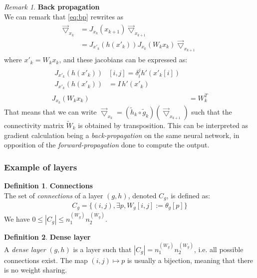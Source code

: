 \documentclass{article}
\theoremstyle{definition}
\newtheorem{definition}{Definition}[section]
\theoremstyle{remark}
\newtheorem{remark}{Remark}[section]
\theoremstyle{plain}
\newcommand{\ovec}{}
\begin{document}
\begin{remark}\textbf{Back propagation}\\
We can remark that \eqref{eq:bp} rewrites as
\begin{align}
  \begin{split}
  \vec{\bigtriangledown}_{x_k} & = J_{x_k}(\ovec{x_{k+1}}) \vec{\bigtriangledown}_{x_{k+1}} \\ 
                               & = J_{x'_k}(h(x'_k)) J_{x_k}(W_k x_k) \vec{\bigtriangledown}_{x_{k+1}}
  \end{split}
\end{align}
where $x'_k = W_k x_k$, and these jacobians can be expressed as:
\begin{align}
  \begin{split}
  J_{x'_k}(h(x'_k)) & [i,j] = \delta_i^j h'(x'_k[i])\\
  J_{x'_k}(h(x'_k)) & = I \hspace{2pt} h'(x'_k)
  \end{split}\\
  J_{x_k}(W_k x_k) & = W_k^T
\end{align}
That means that we can write $\vec{\bigtriangledown}_{x_k} = (\widetilde{h}_k \circ \widetilde{g}_k)(\vec{\bigtriangledown}_{x_{k+1}})$ such that the connectivity matrix $\widetilde{W}_k$ is obtained by transposition. This can be interpreted as gradient calculation being a \emph{back-propagation} on the same neural network, in opposition of the \emph{forward-propagation} done to compute the output.
\end{remark}

\subsubsection{Example of layers}

\begin{definition}\textbf{Connections}\\
The set of \emph{connections} of a layer $(g,h)$, denoted $C_g$, is defined as:
\begin{gather*}
  C_g = \{(i,j), \exists p, W_g[i,j] := \theta_g[p]\}
\end{gather*}
We have $0 \leq |C_g| \leq n_1^{(W_g)} n_2^{(W_g)}$.
\end{definition}

\begin{definition}\textbf{Dense layer}\\
A \emph{dense layer} $(g,h)$ is a layer such that $|C_g| = n_1^{(W_g)} n_2^{(W_g)}$, i.e. all possible connections exist. The map $(i,j) \mapsto p$ is usually a bijection, meaning that there is no weight sharing.
\end{definition}
\end{document}
